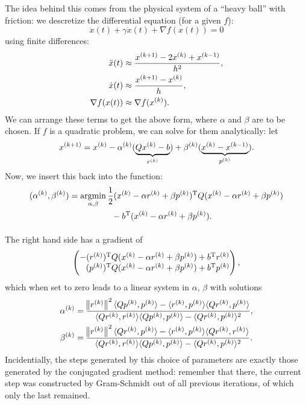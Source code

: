 \documentclass{article}
\begin{document}
The idea behind this comes from the physical system of a ``heavy ball'' with friction: we descretize
the differential equation (for a given \(f\)):
\begin{equation*}
  \ddot{x}(t) + \gamma\dot{x}(t) + \nabla f(x(t)) = 0
\end{equation*}
using finite differences:
\begin{align*}
  \ddot{x}(t) &\approx \frac{\kth[k+1]{x} - 2\kth{x} + \kth[k-1]{x}}{h^2}, \\
  \dot{x}(t) &\approx \frac{\kth[k+1]{x} - \kth{x}}{h}, \\
  \nabla f(x(t)) &\approx \nabla f(\kth{x}).
\end{align*}
We can arrange these terms to get the above form, where \(\alpha\) and \(\beta\) are to be chosen.
If \(f\) is a quadratic problem, we can solve for them analytically: let
\begin{equation*}
  \kth[k+1]{x} = \kth{x} - \kth{\alpha} (\underbrace{Q\kth{x} - b}_{\kth{r}})
  + \kth{\beta}(\underbrace{\kth{x} - \kth[k-1]{x}}_{\kth{p}}).
\end{equation*}
Now, we insert this back into the function:
\begin{align*}
  (\kth{\alpha}, \kth{\beta}) &= \argmin_{\alpha, \beta}
  \frac{1}{2} \T{(\kth{x} - \alpha\kth{r} + \beta\kth{p})}Q(\kth{x} - \alpha\kth{r} + \beta\kth{p}) \\
  &\phantom{\argmin_{\alpha, \beta}}\qquad - \T{b}(\kth{x} - \alpha\kth{r} + \beta\kth{p}).
\end{align*}
The right hand side has a gradient of
\begin{equation*}
  \begin{pmatrix}
    -\T{(\kth{r})}Q(\kth{x} - \alpha\kth{r} + \beta\kth{p}) + \T{b}\kth{r} \\
    \phantom{-}\T{(\kth{p})}Q(\kth{x} - \alpha\kth{r} + \beta\kth{p}) + \T{b}\kth{p}
  \end{pmatrix},
\end{equation*}
which when set to zero leads to a linear system in \(\alpha\), \(\beta\) with solutions
\begin{align*}
  \kth{\alpha} &= \frac{\enVert[1]{\kth{r}}^2 \langle Q\kth{p}, \kth{p} \rangle -
                 \langle \kth{r}, \kth{p} \rangle \langle Q\kth{r}, \kth{p} \rangle}{
                 \langle Q\kth{r}, \kth{r} \rangle \langle Q\kth{p}, \kth{p} \rangle
                 - \langle Q\kth{r}, \kth{p} \rangle^2},\\
  \kth{\beta} &= \frac{\enVert[1]{\kth{r}}^2 \langle Q\kth{r}, \kth{p} \rangle -
                 \langle \kth{r}, \kth{p} \rangle \langle Q\kth{r}, \kth{r} \rangle}{
                 \langle Q\kth{r}, \kth{r} \rangle \langle Q\kth{p}, \kth{p} \rangle
                 - \langle Q\kth{r}, \kth{p} \rangle^2}.
\end{align*}
Incidentially, the steps generated by this choice of parameters are exactly those generated by the
conjugated gradient method: remember that there, the current step was constructed by Gram-Schmidt
out of all previous iterations, of which only the last remained.  
\end{document}
